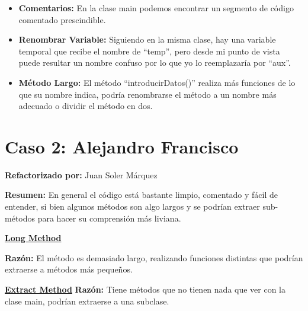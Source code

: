 \documentclass[11pt,a4paper,oneside]{book}
\begin{document}
\begin{itemize}
    \item \textbf{Comentarios: } En la clase main podemos encontrar un segmento de código comentado prescindible.
    
    
     \item \textbf{Renombrar Variable: } Siguiendo en la misma clase, hay una variable temporal que recibe el nombre de ``temp'', pero desde mi punto de vista puede resultar un nombre confuso por lo que yo lo reemplazaría por ``aux''.
     
     
      \item \textbf{Método Largo: } El método ``introducirDatos()'' realiza más funciones de lo que su nombre indica, podría renombrarse el método a un nombre más adecuado o dividir el método en dos.
          
  
\end{itemize}

\chapter{Caso 2: Alejandro Francisco}
\textbf{Refactorizado por:} Juan Soler Márquez \newline

\textbf{ Resumen: } En general el código está bastante limpio, comentado y fácil de entender, si bien algunos métodos son algo largos y se podrían extraer sub-métodos para hacer su comprensión más liviana. 

    \hyperref[longmethod]{\textbf{Long Method}}
      \newline

     \textbf{Razón:} El método es demasiado largo, realizando funciones distintas que podrían extraerse a métodos más pequeños.
    \newline
       \newline

 \hyperref[extractmethod]{\textbf{Extract Method}}
\newline
  \textbf{Razón:} Tiene métodos que no tienen nada que ver con la clase main, podrían extraerse a una subclase.
  \newline

   
  
\end{document}
